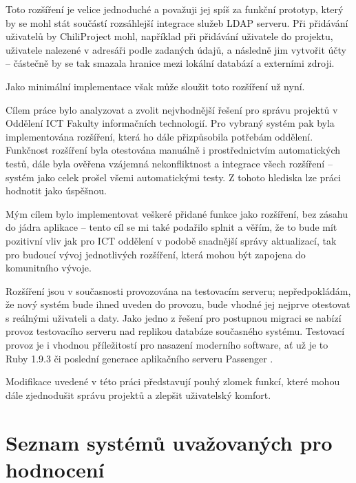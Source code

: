 \documentclass[thesis=B,czech]{FITthesis}[2012/05/02]
\begin{document}
Toto rozšíření je velice jednoduché a považuji jej spíš za funkční
prototyp, který by se mohl stát součástí rozsáhlejší integrace služeb
LDAP serveru. Při přidávání uživatelů by ChiliProject mohl, například
při přidávání uživatele do projektu,  uživatele nalezené
v adresáři podle zadaných údajů, a následně jim vytvořit účty -- částečně
by se tak smazala hranice mezi lokální databází a externími zdroji.

Jako minimální implementace však může sloužit toto rozšíření už nyní.

\begin{conclusion}

Cílem práce bylo analyzovat a zvolit nejvhodnější řešení pro správu projektů v Oddělení ICT Fakulty informačních technologií. Pro vybraný systém pak byla implementována rozšíření, která ho dále přizpůsobila potřebám oddělení. Funkčnost rozšíření byla otestována manuálně i prostřednictvím automatických testů, dále byla ověřena vzájemná nekonfliktnost a integrace všech rozšíření -- systém jako celek prošel všemi automatickými testy. Z tohoto hlediska lze práci hodnotit jako úspěšnou.

Mým cílem bylo implementovat veškeré přidané funkce jako rozšíření, bez zásahu do jádra aplikace -- tento cíl se mi také podařilo splnit a věřím, že to bude mít pozitivní vliv jak pro ICT oddělení v podobě snadnější správy aktualizací, tak pro budoucí vývoj jednotlivých rozšíření, která mohou být zapojena do komunitního vývoje.

Rozšíření jsou v současnosti provozována na testovacím serveru; nepředpokládám, že nový systém bude ihned uveden do provozu, bude vhodné jej nejprve otestovat s reálnými uživateli a daty. Jako jedno z řešení pro postupnou migraci se nabízí provoz testovacího serveru nad replikou databáze současného systému. Testovací provoz je i vhodnou příležitostí pro nasazení moderního software, ať už je to Ruby 1.9.3 či poslední generace aplikačního serveru Passenger \citep{Passenger32}.

Modifikace uvedené v této práci představují pouhý zlomek funkcí, které mohou dále zjednodušit správu projektů a zlepšit uživatelský komfort.

\end{conclusion}




\appendix

\glsaddall
\printglossaries

\chapter{Seznam systémů uvažovaných pro hodnocení}
\label{chap:seznampm}
\end{document}
